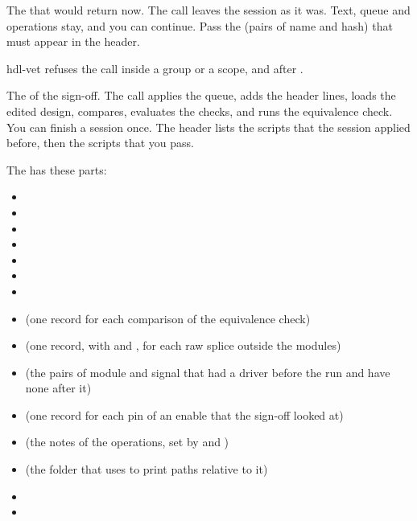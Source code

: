 \begin{entry}{}
\item[Returns] The  that  would return now. The call
  leaves the session as it was. Text, queue and operations stay, and you can continue.
  Pass the  (pairs of name and hash) that must appear in the header.
\item[Refused] hdl-vet refuses the call inside a group or a scope, and after
  .
\end{entry}

\begin{entry}{}
\item[Returns] The  of the sign-off. The call applies the queue, adds the
  header lines, loads the edited design, compares, evaluates the checks, and runs the
  equivalence check. You can
  finish a session once. The header lists the scripts that the session applied before,
  then the scripts that you pass.
\item[Result] The  has these parts:
  \begin{itemize}
  \item {}
  \item {}
  \item {}
  \item {}
  \item {}
  \item {}
  \item {}
  \item {} (one record for each comparison of the equivalence check)
  \item {} (one record, with  and , for each raw splice
    outside the modules)
  \item {} (the pairs of module and signal that had a driver before the run
    and have none after it)
  \item {} (one record for each pin of an enable that the sign-off looked at)
  \item {} (the notes of the operations, set by  and
    )
  \item {} (the folder that  uses to print paths relative to it)
  \item {}
  \item {}

\end{itemize}
\end{entry}
